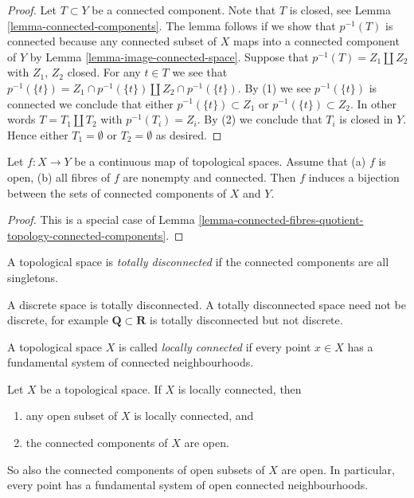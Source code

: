 \begin{proof}
Let $T \subset Y$ be a connected component.
Note that $T$ is closed, see Lemma \ref{lemma-connected-components}.
The lemma follows if we show that $p^{-1}(T)$ is connected
because any connected subset of $X$ maps into a connected component
of $Y$ by Lemma \ref{lemma-image-connected-space}.
Suppose that $p^{-1}(T) = Z_1 \coprod Z_2$
with $Z_1$, $Z_2$ closed. For any $t \in T$ we see that
$p^{-1}(\{t\}) = Z_1 \cap p^{-1}(\{t\}) \coprod Z_2 \cap p^{-1}(\{t\})$.
By (1) we see $p^{-1}(\{t\})$ is connected we conclude that
either $p^{-1}(\{t\}) \subset Z_1$ or $p^{-1}(\{t\}) \subset Z_2$.
In other words $T = T_1 \coprod T_2$ with $p^{-1}(T_i) = Z_i$.
By (2) we conclude that $T_i$ is closed in $Y$.
Hence either $T_1 = \emptyset$ or $T_2 = \emptyset$ as desired.
\end{proof}

\begin{lemma}
\label{lemma-connected-fibres-connected-components}
Let $f : X \to Y$ be a continuous map of topological spaces.
Assume that
(a) $f$ is open,
(b) all fibres of $f$ are nonempty and connected.
Then $f$ induces a bijection between the sets of connected
components of $X$ and $Y$.
\end{lemma}

\begin{proof}
This is a special case of
Lemma \ref{lemma-connected-fibres-quotient-topology-connected-components}.
\end{proof}

\begin{definition}
\label{definition-totally-disconnected}
A topological space is {\it totally disconnected} if the connected components
are all singletons.
\end{definition}

\noindent
A discrete space is totally disconnected.
A totally disconnected space need not be discrete, for example
$\mathbf{Q} \subset \mathbf{R}$ is totally disconnected but not discrete.

\begin{definition}
\label{definition-locally-connected}
A topological space $X$ is called {\it locally connected} if
every point $x \in X$ has a fundamental system of connected neighbourhoods.
\end{definition}

\begin{lemma}
\label{lemma-locally-connected}
Let $X$ be a topological space. If $X$ is locally connected, then
\begin{enumerate}
\item any open subset of $X$ is locally connected, and
\item the connected components of $X$ are open.
\end{enumerate}
So also the connected components of open subsets of $X$ are open.
In particular, every point has a fundamental system of open connected
neighbourhoods.
\end{lemma}


